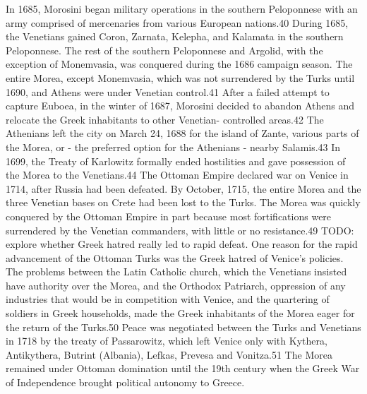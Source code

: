 \documentclass[english,]{book}
\begin{document}
In 1685, Morosini began military operations in the southern Peloponnese with an army comprised of mercenaries from various European nations.40 During 1685, the Venetians gained Coron, Zarnata, Kelepha, and Kalamata in the southern Peloponnese. The rest of the southern Peloponnese and Argolid, with the exception of Monemvasia, was conquered during the 1686 campaign season. The entire Morea, except Monemvasia, which was not surrendered by the Turks until 1690, and Athens were under Venetian control.41 After a failed attempt to capture Euboea, in the winter of 1687, Morosini decided to abandon Athens and relocate the Greek inhabitants to other Venetian- controlled areas.42 The Athenians left the city on March 24, 1688 for the island of Zante, various parts of the Morea, or - the preferred option for the Athenians - nearby Salamis.43 In 1699, the Treaty of Karlowitz formally ended hostilities and gave possession of the Morea to the Venetians.44
The Ottoman Empire declared war on Venice in 1714, after Russia had been defeated. By October, 1715, the entire Morea and the three Venetian bases on Crete had been lost to the Turks. The Morea was quickly conquered by the Ottoman Empire in part because most fortifications were surrendered by the Venetian commanders, with little or no resistance.49 TODO: explore whether Greek hatred really led to rapid defeat. One reason for the rapid advancement of the Ottoman Turks was the Greek hatred of Venice's policies. The problems between the Latin Catholic church, which the Venetians insisted have authority over the Morea, and the Orthodox Patriarch, oppression of any industries that would be in competition with Venice, and the quartering of soldiers in Greek households, made the Greek inhabitants of the Morea eager for the return of the Turks.50 Peace was negotiated between the Turks and Venetians in 1718 by the treaty of Passarowitz, which left Venice only with Kythera, Antikythera, Butrint (Albania), Lefkas, Prevesa and Vonitza.51 The Morea remained under Ottoman domination until the 19th century when the Greek War of Independence brought political autonomy to Greece.
\end{document}
